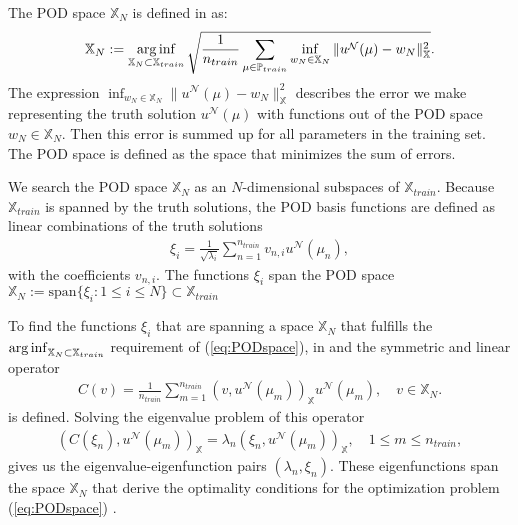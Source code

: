 The POD space $\mathbb{X}_{N}$ is defined in \cite[Section 3.2.1 (3.8)]{HRSbook} as:
\begin{align}
\label{eq:PODspace}
\mathbb{X}_{N} := 
\operatorname*{arg\,inf}_{ \mathbb{X}_N \subset \mathbb{X}_{train} } 
\sqrt{ 
	\frac{1}{ n_{train} } 
	\sum_{ \mu \in \mathbb{P}_{train} }   
	\inf_{ w_N \in \mathbb{X}_N } \| u^\mathcal{N}(\mu) - w_N \|_\mathbb{X}^2 
}.
\end{align}
The expression $\inf_{ w_N \in \mathbb{X}_N } \| u^\mathcal{N}(\mu) - w_N \|_\mathbb{X}^2 $ describes the error we make representing the truth solution $u^\mathcal{N}(\mu)$ with functions out of the POD space $w_N \in \mathbb{X}_N$.
Then this error is summed up for all parameters in the training set. 
The POD space is defined as the space that minimizes the sum of errors.

We search the POD space $\mathbb{X}_{N}$ as an $N$-dimensional subspaces of $ \mathbb{X}_{train} $.
Because  $ \mathbb{X}_{train} $  is spanned by the truth solutions, the POD basis functions are defined as linear combinations of the truth solutions
\begin{align}
	\label{eq:PODfunc}
	\xi_i = 
	\frac{1}{\sqrt{\lambda_{i}}} 
	\sum_{n=1}^{n_{train}} 
	v_{n,i} 
	u^\mathcal{ N }(\mu_{n}),	
\end{align}
with the coefficients $v_{n,i}$.
The functions $\xi_i$ span the POD space
$ \mathbb{X}_{N} := \text{span}\{ \xi_i : 1\leq i \leq N \} \subset \mathbb{X}_{train}$

To find the functions $\xi_i$ that are  spanning a space $\mathbb{X}_{N}$ that fulfills the $\operatorname*{arg\,inf}_{ \mathbb{X}_N \subset \mathbb{X}_{train} }$ requirement of (\ref{eq:PODspace}), in \cite[Section 3.2.1]{HRSbook} and \cite[Section 3.1]{GalerkingPOD} the symmetric and linear operator
\begin{align*}
C(v) =
\frac{1}{n_{train}}
\sum_{m=1}^{n_{train}} 
( v ,u^\mathcal{N}(\mu_{m}) )_\mathbb{X} u^\mathcal{N}(\mu_{m}) 
, \quad 
v \in \mathbb{X}_{N}.
\end{align*}
is defined.
Solving the eigenvalue problem of this operator 
\begin{align}
\label{eq:evpfunk}
\left(C(\xi_n),u^\mathcal{N}(\mu_{m})\right)_\mathbb{X}
=
\lambda_n(\xi_n,u^\mathcal{N}(\mu_{m}))_\mathbb{X}
, \quad 
1 \leq m \leq n_{train},
\end{align}
gives us the eigenvalue-eigenfunction pairs $(\lambda_{n},\xi_n)$. These eigenfunctions span the space $\mathbb{X}_{N}$ that derive the optimality conditions for the optimization problem (\ref{eq:PODspace}) \cite{GalerkingPOD, Volkwein2001}.

